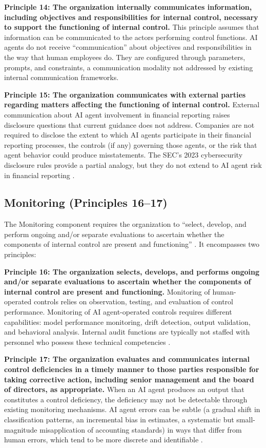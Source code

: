 \documentclass[12pt]{article}
\begin{document}
\textbf{Principle 14: The organization internally communicates information, including objectives and responsibilities for internal control, necessary to support the functioning of internal control.} This principle assumes that information can be communicated to the actors performing control functions. AI agents do not receive ``communication'' about objectives and responsibilities in the way that human employees do. They are configured through parameters, prompts, and constraints, a communication modality not addressed by existing internal communication frameworks.

\textbf{Principle 15: The organization communicates with external parties regarding matters affecting the functioning of internal control.} External communication about AI agent involvement in financial reporting raises disclosure questions that current guidance does not address. Companies are not required to disclose the extent to which AI agents participate in their financial reporting processes, the controls (if any) governing those agents, or the risk that agent behavior could produce misstatements. The SEC's 2023 cybersecurity disclosure rules provide a partial analogy, but they do not extend to AI agent risk in financial reporting \citep{sec2023cybersecurity}.

\subsection{Monitoring (Principles 16--17)}

The Monitoring component requires the organization to ``select, develop, and perform ongoing and/or separate evaluations to ascertain whether the components of internal control are present and functioning'' \citep{coso2013}. It encompasses two principles:

\textbf{Principle 16: The organization selects, develops, and performs ongoing and/or separate evaluations to ascertain whether the components of internal control are present and functioning.} Monitoring of human-operated controls relies on observation, testing, and evaluation of control performance. Monitoring of AI agent-operated controls requires different capabilities: model performance monitoring, drift detection, output validation, and behavioral analysis. Internal audit functions are typically not staffed with personnel who possess these technical competencies \citep{iia2025}.

\textbf{Principle 17: The organization evaluates and communicates internal control deficiencies in a timely manner to those parties responsible for taking corrective action, including senior management and the board of directors, as appropriate.} When an AI agent produces an output that constitutes a control deficiency, the deficiency may not be detectable through existing monitoring mechanisms. AI agent errors can be subtle (a gradual shift in classification patterns, an incremental bias in estimates, a systematic but small-magnitude misapplication of accounting standards) in ways that differ from human errors, which tend to be more discrete and identifiable \citep{nist2023}.
\end{document}
